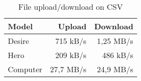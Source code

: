 \begin{table}
  \centering
  \caption{File upload/download on CSV}
  \begin{tabular}{ | l | r | r |}
    \hline
    \textbf{Model}    &   \textbf{Upload}  &   \textbf{Download}   \\ \hline
    Desire   &   715 kB/s & 1,25 MB/s   \\ \hline                
    Hero     &   209 kB/s & 486 kB/s    \\ \hline 
    Computer &  27,7 MB/s & 24,9 MB/s \\ \hline
  \end{tabular}
  \label{tbl:files:encrypted}
\end{table}
